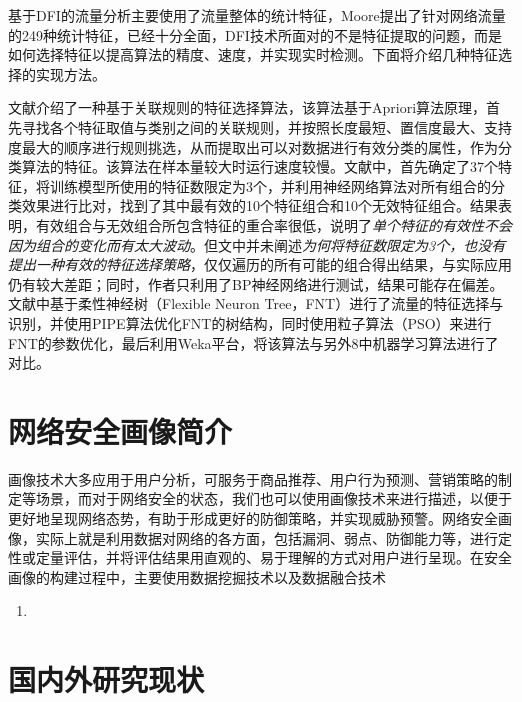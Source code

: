 \documentclass[a4papper]{article}
\begin{document}
\par\setlength{\parindent}{2em} %
基于DFI的流量分析主要使用了流量整体的统计特征，Moore提出了针对网络流量的249种统计特征，已经十分全面，DFI技术所面对的不是特征提取的问题，而是如何选择特征以提高算法的精度、速度，并实现实时检测。下面将介绍几种特征选择的实现方法。
\par\setlength{\parindent}{2em} %
文献\cite{武建华2009基于关联规则的特征选择算法}介绍了一种基于关联规则的特征选择算法，该算法基于Apriori算法原理，首先寻找各个特征取值与类别之间的关联规则，并按照长度最短、置信度最大、支持度最大的顺序进行规则挑选，从而提取出可以对数据进行有效分类的属性，作为分类算法的特征。该算法在样本量较大时运行速度较慢。文献\cite{牟澄2014互联网流量特征智能提取关键技术研究}中，首先确定了37个特征，将训练模型所使用的特征数限定为3个，并利用神经网络算法对所有组合的分类效果进行比对，找到了其中最有效的10个特征组合和10个无效特征组合。结果表明，有效组合与无效组合所包含特征的重合率很低，说明了\emph{单个特征的有效性不会因为组合的变化而有太大波动}。但文中并未阐述\emph{为何将特征数限定为3个，也没有提出一种有效的特征选择策略}，仅仅遍历的所有可能的组合得出结果，与实际应用仍有较大差距；同时，作者只利用了BP神经网络进行测试，结果可能存在偏差。文献\cite{彭立志2015基于机器学习的流量识别关键技术研究}中基于柔性神经树（Flexible Neuron Tree，FNT）进行了流量的特征选择与识别，并使用PIPE算法优化FNT的树结构，同时使用粒子算法（PSO）来进行FNT的参数优化，最后利用Weka平台，将该算法与另外8中机器学习算法进行了对比。


\section{网络安全画像简介}
\par\setlength{\parindent}{2em} %
画像技术大多应用于用户分析，可服务于商品推荐、用户行为预测、营销策略的制定等场景，而对于网络安全的状态，我们也可以使用画像技术来进行描述，以便于更好地呈现网络态势，有助于形成更好的防御策略，并实现威胁预警。网络安全画像，实际上就是利用数据对网络的各方面，包括漏洞、弱点、防御能力等，进行定性或定量评估，并将评估结果用直观的、易于理解的方式对用户进行呈现。在安全画像的构建过程中，主要使用数据挖掘技术以及数据融合技术
\begin{enumerate}
\item  
\end{enumerate}
\section{国内外研究现状}
\par\setlength{\parindent}{2em} %
\end{document}
